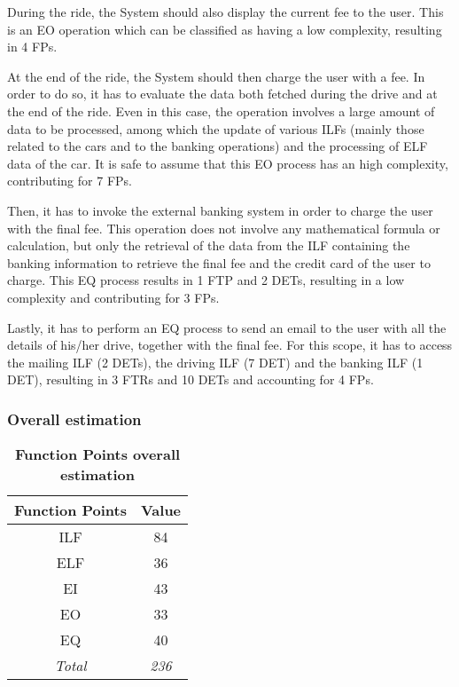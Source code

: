 During the ride, the System should also display the current fee to the user. This is an EO operation which can be classified as having a low complexity, resulting in 4 FPs.

At the end of the ride, the System should then charge the user with a fee. In order to do so, it has to evaluate the data both fetched during the drive and at the end of the ride. Even in this case, the operation involves a large amount of data to be processed, among which the update of various ILFs (mainly those related to the cars and to the banking operations) and the processing of ELF data of the car. It is safe to assume that this EO process has an high complexity, contributing for 7 FPs.

Then, it has to invoke the external banking system in order to charge the user with the final fee. This operation does not involve any mathematical formula or calculation, but only the retrieval of the data from the ILF containing the banking information to retrieve the final fee and the credit card of the user to charge. This EQ process results in 1 FTP and 2 DETs, resulting in a low complexity and contributing for 3 FPs.

Lastly, it has to perform an EQ process to send an email to the user with all the details of his/her drive, together with the final fee. For this scope, it has to access the mailing ILF (2 DETs), the driving ILF (7 DET) and the banking ILF (1 DET), resulting in 3 FTRs and 10 DETs and accounting for 4 FPs.


\subsubsection{Overall estimation}
\begin{longtable}{| c | c |}
	\caption{\textbf{Function Points overall estimation}} %
	\label{tab:fp_results}%
	\\ \hline %
	
	\textbf{Function Points } & \textbf{Value} \\ \hline
	ILF & 84 \\ \hline
	ELF & 36 \\ \hline
	EI & 43 \\ \hline
	EO & 33 \\ \hline
	EQ & 40 \\ \hline
	\emph{Total} & \emph{236} \\ \hline
\end{longtable}

